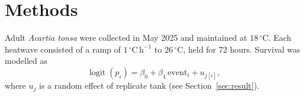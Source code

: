 \section{Methods}
\label{sec:methods}

Adult \textit{Acartia tonsa} were collected in May 2025 and maintained at 18\,$^\circ$C.
Each heatwave consisted of a ramp of $1\,^\circ\mathrm{C}\,\mathrm{h}^{-1}$ to 26\,$^\circ$C, held for 72 hours.
Survival was modelled as
\begin{equation}
  \operatorname{logit}(p_i) = \beta_0 + \beta_1 \, \mathrm{event}_i + u_{j[i]},
  \label{eq:survival}
\end{equation}
where $u_j$ is a random effect of replicate tank (see Section~\ref{sec:result}).
